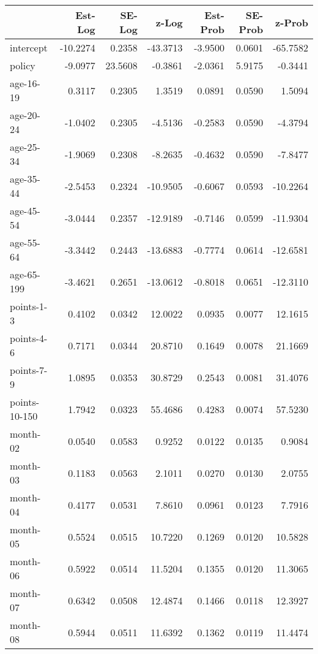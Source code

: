 \documentclass[10pt]{article}
\begin{document}

\begin{table}[ht]
\centering
\begin{tabular}{lrrrrrr}
  \hline
 & Est-Log & SE-Log & z-Log & Est-Prob & SE-Prob & z-Prob \\ 
  \hline
intercept & -10.2274 & 0.2358 & -43.3713 & -3.9500 & 0.0601 & -65.7582 \\ 
  policy & -9.0977 & 23.5608 & -0.3861 & -2.0361 & 5.9175 & -0.3441 \\ 
  age-16-19 & 0.3117 & 0.2305 & 1.3519 & 0.0891 & 0.0590 & 1.5094 \\ 
  age-20-24 & -1.0402 & 0.2305 & -4.5136 & -0.2583 & 0.0590 & -4.3794 \\ 
  age-25-34 & -1.9069 & 0.2308 & -8.2635 & -0.4632 & 0.0590 & -7.8477 \\ 
  age-35-44 & -2.5453 & 0.2324 & -10.9505 & -0.6067 & 0.0593 & -10.2264 \\ 
  age-45-54 & -3.0444 & 0.2357 & -12.9189 & -0.7146 & 0.0599 & -11.9304 \\ 
  age-55-64 & -3.3442 & 0.2443 & -13.6883 & -0.7774 & 0.0614 & -12.6581 \\ 
  age-65-199 & -3.4621 & 0.2651 & -13.0612 & -0.8018 & 0.0651 & -12.3110 \\ 
  points-1-3 & 0.4102 & 0.0342 & 12.0022 & 0.0935 & 0.0077 & 12.1615 \\ 
  points-4-6 & 0.7171 & 0.0344 & 20.8710 & 0.1649 & 0.0078 & 21.1669 \\ 
  points-7-9 & 1.0895 & 0.0353 & 30.8729 & 0.2543 & 0.0081 & 31.4076 \\ 
  points-10-150 & 1.7942 & 0.0323 & 55.4686 & 0.4283 & 0.0074 & 57.5230 \\ 
  month-02 & 0.0540 & 0.0583 & 0.9252 & 0.0122 & 0.0135 & 0.9084 \\ 
  month-03 & 0.1183 & 0.0563 & 2.1011 & 0.0270 & 0.0130 & 2.0755 \\ 
  month-04 & 0.4177 & 0.0531 & 7.8610 & 0.0961 & 0.0123 & 7.7916 \\ 
  month-05 & 0.5524 & 0.0515 & 10.7220 & 0.1269 & 0.0120 & 10.5828 \\ 
  month-06 & 0.5922 & 0.0514 & 11.5204 & 0.1355 & 0.0120 & 11.3065 \\ 
  month-07 & 0.6342 & 0.0508 & 12.4874 & 0.1466 & 0.0118 & 12.3927 \\ 
  month-08 & 0.5944 & 0.0511 & 11.6392 & 0.1362 & 0.0119 & 11.4474 \\ 

\end{tabular}
\end{table}
\end{document}
